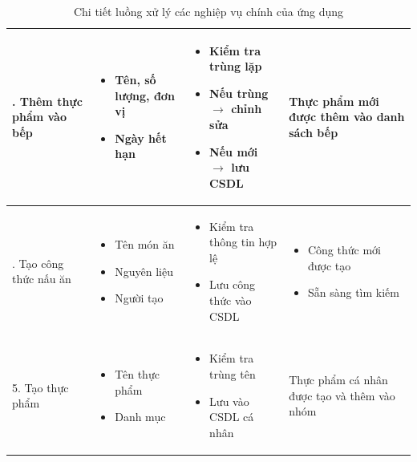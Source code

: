 \documentclass[a4paper,12pt]{article}
\begin{document}
\begin{table}[H]
\begin{tabularx}{\textwidth}{|>{\RaggedRight\arraybackslash}p{3cm}|X|X|X|}
        3. Thêm thực phẩm vào bếp & 
        \begin{itemize}[leftmargin=*, nosep]
            \item Tên, số lượng, đơn vị
            \item Ngày hết hạn
        \end{itemize} & 
        \begin{itemize}[leftmargin=*, nosep]
            \item Kiểm tra trùng lặp
            \item Nếu trùng $\rightarrow$ chỉnh sửa
            \item Nếu mới $\rightarrow$ lưu CSDL
        \end{itemize} & 
        Thực phẩm mới được thêm vào danh sách bếp \\ \hline
        
        4. Tạo công thức nấu ăn & 
        \begin{itemize}[leftmargin=*, nosep]
            \item Tên món ăn
            \item Nguyên liệu
            \item Người tạo
        \end{itemize} & 
        \begin{itemize}[leftmargin=*, nosep]
            \item Kiểm tra thông tin hợp lệ
            \item Lưu công thức vào CSDL
        \end{itemize} & 
        \begin{itemize}[leftmargin=*, nosep]
            \item Công thức mới được tạo
            \item Sẵn sàng tìm kiếm
        \end{itemize} \\ \hline
        
        5. Tạo thực phẩm & 
        \begin{itemize}[leftmargin=*, nosep]
            \item Tên thực phẩm
            \item Danh mục
        \end{itemize} & 
        \begin{itemize}[leftmargin=*, nosep]
            \item Kiểm tra trùng tên
            \item Lưu vào CSDL cá nhân
        \end{itemize} & 
        Thực phẩm cá nhân được tạo và thêm vào nhóm \\ \hline
    \end{tabularx}
    \caption{Chi tiết luồng xử lý các nghiệp vụ chính của ứng dụng}
    \label{tab:nghiep-vu}
\end{table}









\end{document}

